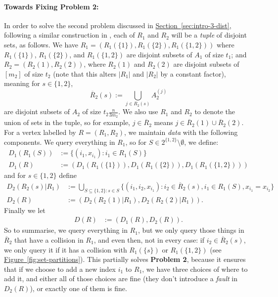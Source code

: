 \documentclass{article}
\renewcommand{\sec}[1]{\hyperref[sec:#1]{Section~\ref*{sec:#1}}}
\newcommand{\fig}[1]{\hyperref[fig:#1]{Figure~\ref*{fig:#1}}}
\renewcommand{\>}{\rangle}
\newcommand{\<}{\langle}
\renewcommand{\(}{\left(}
\renewcommand{\)}{\right)}
\def\abs#1{\left| #1 \right|}
\begin{document}
\paragraph{Towards Fixing Problem 2:} In order to solve the second problem discussed in \sec{intro-3-dist}, following a similar construction in \cite{belovs2012kDist}, each of $R_1$ and $R_2$ will be a \emph{tuple} of disjoint sets, as follows. We have $R_1=(R_1(\{1\}),R_1(\{2\}),R_1(\{1,2\}))$ where $R_1(\{1\})$, $R_1(\{2\})$, and $R_1(\{1,2\})$ are disjoint subsets of $A_1$ of size $t_1$; and $R_2=(R_2(1),R_2(2))$, where $R_2(1)$ and $R_2(2)$ are disjoint subsets of $[m_2]$ of size $t_2$ (note that this alters $\abs{R_1}$ and $\abs{R_2}$ by a constant factor), meaning for $s\in\{1,2\}$, 
$$\overline{R}_2(s):=\bigcup_{j\in R_2(s)}A_2^{(j)}$$
are disjoint subsets of $A_2$ of size $t_2\frac{n}{3m_2}$. We also use $R_1$ and $R_2$ to denote the union of sets in the tuple, so for example, $j\in \overline{R}_2$ means $j\in \overline{R}_2(1)\cup\overline{R}_2(2)$. 
For a vertex labelled by $R = (R_1,R_2)$, we maintain \emph{data} with the following components. We query everything in $R_1$, so for $S\in 2^{\{1,2\}}\setminus\emptyset$, we define:
\begin{equation*}\label{eq:3-dist-D1}
\begin{split}
D_1(R_1(S)) &:= \{(i_1,x_{i_1}): i_1\in R_1(S)\}\\
D_1(R) &:= (D_1(R_1(\{1\})),D_1(R_1(\{2\})),D_1(R_1(\{1,2\})))
\end{split}
\end{equation*}
and for $s\in \{1,2\}$ define
\begin{equation}\label{eq:3-dist-D2}
\begin{split}
D_2(R_2(s)|R_1) &:= \bigcup_{S\subseteq \{1,2\}:s\in S} \{(i_1,i_2,x_{i_1}): i_2\in \overline{R}_2(s), i_1\in R_1(S),x_{i_1}=x_{i_2}\}\\
D_2(R) &:= (D_2(R_2(1)|R_1),D_2(R_2(2)|R_1)).
\end{split}
\end{equation}
Finally we let
\begin{align*}
D(R) &:= (D_1(R),D_2(R)).
\end{align*}
So to summarise, we query everything in $R_1$, but we only query those things in $\overline{R}_2$ that have a collision in $R_1$, and even then, not in every case: if $i_2\in \overline{R}_2(s)$, we only query it if it has a collision with $R_1(\{s\})$ or $R_1(\{1,2\})$ (see \fig{set-partitions}). This partially solves \textbf{Problem 2}, because it ensures that if we choose to add a new index $i_1$ to $R_1$, we have three choices of where to add it, and either all of those choices are fine (they don't introduce a \emph{fault} in $D_2(R)$), or exactly one of them is fine. 
\end{document}

